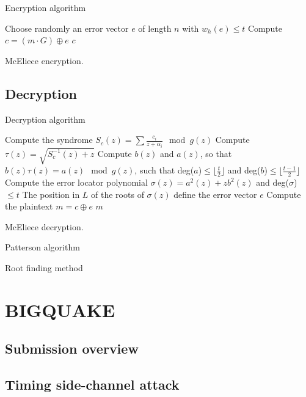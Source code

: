 Encryption algorithm
\begin{algorithm}[!ht]
Choose randomly an error vector $e$ of length $n$ with $w_h(e)\leq t$\;
Compute $c = (m\cdot G) \oplus e$\;
\Return $c$\;

 \caption{McEliece encryption.}\label{alg:2}
\end{algorithm}

\subsection{Decryption}
\label{sub:mc-dec}
Decryption algorithm

\begin{algorithm}[H]
 Compute the syndrome $S_c(z) = \sum{\frac{c_i}{z+\alpha_i}} \mod g(z)$\;
 Compute $\tau(z) = \sqrt{S^{-1}_{c}(z)+z}$\;
 Compute $b(z)$ and $a(z)$, so that $b(z)\tau(z) = a(z) \mod g(z)$, such that deg($a$)$\leq \lfloor \frac{t}{2} \rfloor$ and deg($b$)$\leq \lfloor \frac{t-1}{2} \rfloor$\;
 Compute the error locator polynomial $\sigma(z) = a^2(z) + zb^2(z)$ and deg($\sigma$) $\leq t$\;
 The position in $L$ of the roots of $\sigma(z)$ define the error vector $e$\;
 Compute the plaintext $m = c \oplus e$\;
 \Return $m$\;
 \caption{McEliece decryption.}\label{alg:3}
\end{algorithm}

Patterson algorithm

Root finding method


\section{BIGQUAKE}
\subsection{Submission overview}
\subsection{Timing side-channel attack}